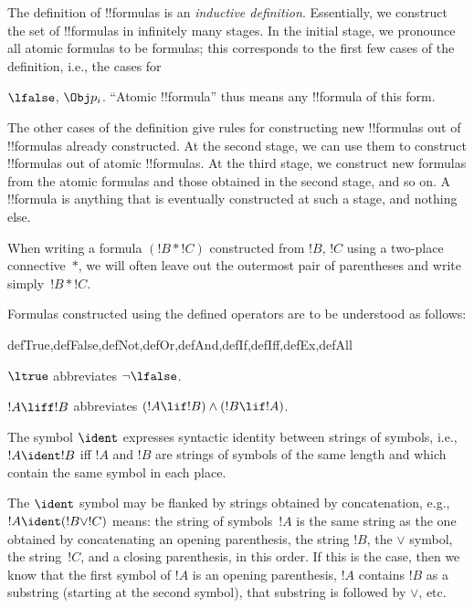 \begin{explain}
The definition of !!{formula}s is an
\emph{inductive definition}.  Essentially, we construct the set of
!!{formula}s in infinitely many stages.  In the initial stage, we
pronounce all atomic formulas to be formulas; this corresponds to the
first few cases of the definition, i.e., the cases for

$\lfalse$, 
$\Obj p_i$.  ``Atomic !!{formula}''
thus means any !!{formula} of this form.

The other cases of the definition give rules for constructing new
!!{formula}s out of !!{formula}s already constructed.  At the second
stage, we can use them to construct !!{formula}s out of atomic
!!{formula}s.  At the third stage, we construct new formulas from the
atomic formulas and those obtained in the second stage, and so on.  A
!!{formula} is anything that is eventually constructed at such a
stage, and nothing else.
\end{explain}

When writing a formula $(!B \ast !C)$ constructed from $!B$, $!C$
using a two-place connective~$\ast$, we will often leave out the
outermost pair of parentheses and write simply~$!B \ast !C$.


\begin{defn}
Formulas constructed using the defined operators are to be understood
as follows:

\begin{tagenumerate}{defTrue,defFalse,defNot,defOr,defAnd,defIf,defIff,defEx,defAll}

$\ltrue$ abbreviates
  $\lnot\lfalse$.











$!A \liff !B$ abbreviates $(!A \lif !B) \land (!B
  \lif !A)$.
\end{tagenumerate}
\end{defn}


\begin{defn}
The symbol $\ident$ expresses syntactic identity between strings of
symbols, i.e., $!A \ident !B$ iff $!A$ and $!B$ are strings of symbols
of the same length and which contain the same symbol in each place.
\end{defn}

The $\ident$ symbol may be flanked by strings obtained by
concatenation, e.g., $!A \ident (!B \lor !C)$ means: the string of
symbols~$!A$ is the same string as the one obtained by concatenating
an opening parenthesis, the string $!B$, the $\lor$ symbol, the
string~$!C$, and a closing parenthesis, in this order. If this is the
case, then we know that the first symbol of $!A$ is an opening
parenthesis, $!A$ contains $!B$ as a substring (starting at the second
symbol), that substring is followed by $\lor$, etc.





